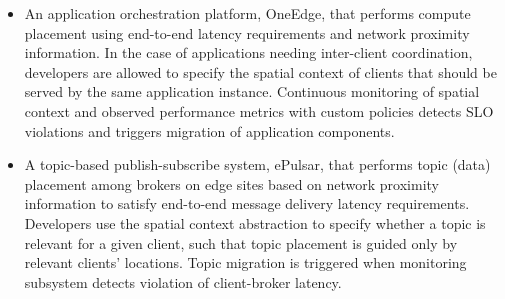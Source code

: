 \begin{itemize}
\item An application orchestration platform, OneEdge, that performs compute placement using end-to-end latency requirements and network proximity information. In the case of applications needing inter-client coordination, developers are allowed to specify the spatial context of clients that should be served by the same application instance. Continuous monitoring of spatial context and observed performance metrics with custom policies detects SLO violations and triggers migration of application components. 

\item A topic-based publish-subscribe system, ePulsar, that performs topic (data) placement among brokers on edge sites based on network proximity information to satisfy end-to-end message delivery latency requirements. Developers use the spatial context abstraction to specify whether a topic is relevant for a given client, such that topic placement is guided only by relevant clients’ locations. Topic migration is triggered when monitoring subsystem detects violation of client-broker latency.


\end{itemize}

